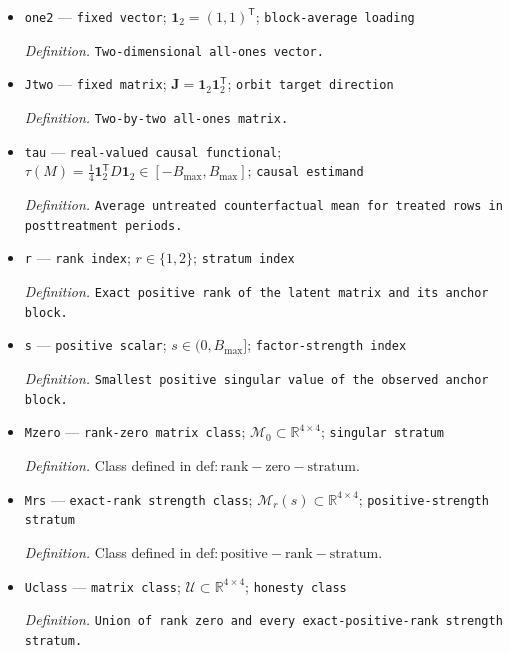 \documentclass{article}
\begin{document}
\begin{itemize}
  \item \texttt{one2} --- \texttt{fixed vector}; \(\mathbf 1_2=(1,1)^{\mathsf T}\); \texttt{block-\allowbreak{}average loading}
  \par\smallskip\noindent\emph{Definition.} \texttt{Two-\allowbreak{}dimensional all-\allowbreak{}ones vector.}
  \item \texttt{Jtwo} --- \texttt{fixed matrix}; \(\mathbf J=\mathbf 1_2\mathbf 1_2^{\mathsf T}\); \texttt{orbit target direction}
  \par\smallskip\noindent\emph{Definition.} \texttt{Two-\allowbreak{}by-\allowbreak{}two all-\allowbreak{}ones matrix.}
  \item \texttt{tau} --- \texttt{real-\allowbreak{}valued causal functional}; \(\tau(M)=\tfrac14\mathbf 1_2^{\mathsf T}D\mathbf 1_2\in[-B_{\max},B_{\max}]\); \texttt{causal estimand}
  \par\smallskip\noindent\emph{Definition.} \texttt{Average untreated counterfactual mean for treated rows in posttreatment periods.}
  \item \texttt{r} --- \texttt{rank index}; \(r\in\{1,2\}\); \texttt{stratum index}
  \par\smallskip\noindent\emph{Definition.} \texttt{Exact positive rank of the latent matrix and its anchor block.}
  \item \texttt{s} --- \texttt{positive scalar}; \(s\in(0,B_{\max}]\); \texttt{factor-\allowbreak{}strength index}
  \par\smallskip\noindent\emph{Definition.} \texttt{Smallest positive singular value of the observed anchor block.}
  \item \texttt{Mzero} --- \texttt{rank-\allowbreak{}zero matrix class}; \(\mathcal M_0\subset\mathbb R^{4\times4}\); \texttt{singular stratum}
  \par\smallskip\noindent\emph{Definition.} Class defined in \(\mathrm{def:rank-zero-stratum}\).
  \item \texttt{Mrs} --- \texttt{exact-\allowbreak{}rank strength class}; \(\mathcal M_r(s)\subset\mathbb R^{4\times4}\); \texttt{positive-\allowbreak{}strength stratum}
  \par\smallskip\noindent\emph{Definition.} Class defined in \(\mathrm{def:positive-rank-stratum}\).
  \item \texttt{Uclass} --- \texttt{matrix class}; \(\mathcal U\subset\mathbb R^{4\times4}\); \texttt{honesty class}
  \par\smallskip\noindent\emph{Definition.} \texttt{Union of rank zero and every exact-\allowbreak{}positive-\allowbreak{}rank strength stratum.}

\end{itemize}
\end{document}
